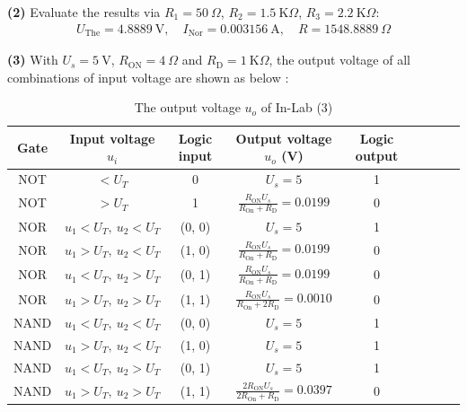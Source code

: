 \documentclass[UTF8]{report}
\def\kO{\ \mathrm{K}\Omega}
\def\KO{\ \mathrm{K}\Omega}
\theoremstyle{MyLineTheoremStyle} %
\theoremstyle{MyBlockTheoremStyle} %
\theoremstyle{MySubsubsectionStyle} %
\begin{document}
\noindent \textbf{(2)}
Evaluate the results via $R_1 = 50 \ \Omega$, $R_2 = 1.5 \kO$, $R_3 = 2.2 \kO$:
\begin{gather}
    U_{\text{The}} = 4.8889 \ \mathrm{V},\quad I_{\text{Nor}} = 0.003156 \ \mathrm{A},\quad  R = 1548.8889 \ \Omega
\end{gather}

\noindent \textbf{(3) }
With $U_s = 5 \ \mathrm{V}$, $R_{\text{ON}} = 4 \ \Omega$ and $R_{\text{D}} = 1 \KO$, the output voltage of all combinations of input voltage are shown as below : 

\begin{table}[H]\centering
    \caption{The output voltage $u_o$ of In-Lab (3)}
    \label{The output voltage of In-Lab (3)}
\begin{tabular}{ccccccccc}\toprule
    Gate & Input voltage $u_i$ & Logic input   & Output voltage $u_o$ (V) & Logic output  \\
    \hline
    NOT  & $< U_T$ & 0 &  $U_s = 5$ & 1 \\
    NOT  & $> U_T$ & 1 &  $\frac{R_{\text{ON}}U_s}{R_{\text{On}}+R_\text{D}} = 0.0199$ & 0 \\
    NOR  & $u_1 < U_T,\ u_2 < U_T $ & (0, 0) & $U_s = 5$ & 1\\
    NOR  & $u_1 > U_T,\ u_2 < U_T $ & (1, 0) & $\frac{R_{\text{ON}}U_s}{R_{\text{On}}+R_\text{D}} = 0.0199$ & 0 \\
    NOR  & $u_1 < U_T,\ u_2 > U_T $ & (0, 1) & $\frac{R_{\text{ON}}U_s}{R_{\text{On}}+R_\text{D}} = 0.0199$ & 0 \\
    NOR  & $u_1 > U_T,\ u_2 > U_T $ & (1, 1) & $\frac{R_{\text{ON}}U_s}{R_{\text{On}}+2R_\text{D}} = 0.0010$ & 0 \\
    NAND & $u_1 < U_T,\ u_2 < U_T $ & (0, 0) & $U_s = 5$ & 1\\
    NAND & $u_1 > U_T,\ u_2 < U_T $ & (1, 0) & $U_s = 5$ & 1\\
    NAND & $u_1 < U_T,\ u_2 > U_T $ & (0, 1) & $U_s = 5$ & 1\\
    NAND & $u_1 > U_T,\ u_2 > U_T $ & (1, 1) & $\frac{2R_{\text{ON}}U_s}{2R_{\text{On}}+R_\text{D}} = 0.0397$ & 0\\
    \bottomrule
\end{tabular}
\end{table}
\end{document}

